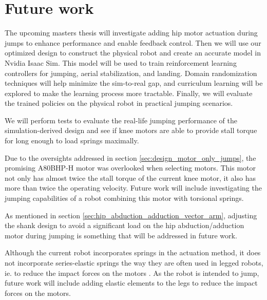 \section{Future work}
\label{sec:future_work}
The upcoming masters thesis will investigate adding hip motor actuation during jumps to enhance performance and enable feedback control. Then we will use our optimized design to construct the physical robot and create an accurate model in Nvidia Isaac Sim. This model will be used to train reinforcement learning controllers for jumping, aerial stabilization, and landing. Domain randomization techniques will help minimize the sim-to-real gap, and curriculum learning will be explored to make the learning process more tractable. Finally, we will evaluate the trained policies on the physical robot in practical jumping scenarios.

We will perform tests to evaluate the real-life jumping performance of the simulation-derived design and see if knee motors are able to provide stall torque for long enough to load springs maximally.

Due to the oversights addressed in section \ref{sec:design_motor_only_jumps}, the promising A80BHP-H motor was overlooked when selecting motors. This motor not only has almost twice the stall torque of the current knee motor, it also has more than twice the operating velocity. Future work will include investigating the jumping capabilities of a robot combining this motor with torsional springs.

As mentioned in section \ref{sec:hip_abduction_adduction_vector_arm}, adjusting the shank design to avoid a significant load on the hip abduction/adduction motor during jumping is something that will be addressed in future work. 

Although the current robot incorporates springs in the actuation method, it does not incorporate series-elastic springs the way they are often used in legged robots, ie. to reduce the impact forces on the motors \cite{proprioceptive}. As the robot is intended to jump, future work will include adding elastic elements to the legs to reduce the impact forces on the motors.
